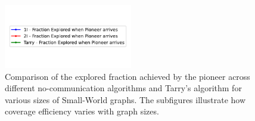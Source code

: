 \begin{figure}[H]
    \centering
    \qquad
    \qquad
    \includegraphics[width=0.5\textwidth]{Cap3/no_comm_fraction_legend.pdf}
    \newline
    \qquad
    \newline
    \qquad
    \caption{Comparison of the explored fraction achieved by the pioneer across different no-communication algorithms and Tarry's algorithm for various sizes of Small-World graphs. The subfigures illustrate how coverage efficiency varies with graph sizes.}
    \label{fig_no_comm_fraction_all_sizes_sw}
\end{figure}


